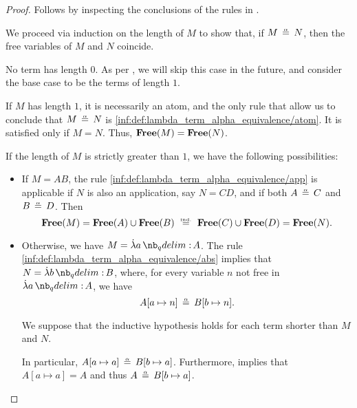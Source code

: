 \begin{proof}
   Follows by inspecting the conclusions of the rules in .

   We proceed via induction on the length of \( M \) to show that, if \( M \aequiv N \), then the free variables of \( M \) and \( N \) coincide.

  No term has length \( 0 \). As per , we will skip this case in the future, and consider the base case to be the terms of length \( 1 \).

  If \( M \) has length \( 1 \), it is necessarily an atom, and the only rule that allow us to conclude that \( M \aequiv N \) is \ref{inf:def:lambda_term_alpha_equivalence/atom}. It is satisfied only if \( M = N \). Thus, \( \op*{Free}(M) = \op*{Free}(N) \).

  If the length of \( M \) is strictly greater than \( 1 \), we have the following possibilities:
  \begin{itemize}
    \item If \( M = AB \), the rule \ref{inf:def:lambda_term_alpha_equivalence/app} is applicable if \( N \) is also an application, say \( N = CD \), and if both \( A \aequiv C \) and \( B \aequiv D \). Then
    \begin{equation*}
      \op*{Free}(M)
      =
      \op*{Free}(A) \cup \op*{Free}(B)
      \reloset{\T{ind.}} =
      \op*{Free}(C) \cup \op*{Free}(D)
      =
      \op*{Free}(N).
    \end{equation*}

    \item Otherwise, we have \( M = \qabs a A \). The rule \ref{inf:def:lambda_term_alpha_equivalence/abs} implies that \( N = \qabs b B \), where, for every variable \( n \) not free in \( \qabs a A \), we have
    \begin{equation*}
      A[a \mapsto n] \aequiv B[b \mapsto n].
    \end{equation*}

    We suppose that the inductive hypothesis holds for each term shorter than \( M \) and \( N \).

    In particular, \( A[a \mapsto a] \aequiv B[b \mapsto a] \). Furthermore,  implies that \( A[a \mapsto a] = A \) and thus \( A \aequiv B[b \mapsto a] \).


\end{itemize}
\end{proof}
